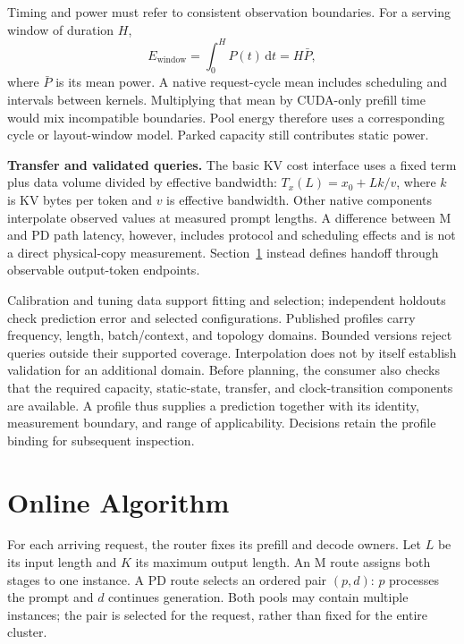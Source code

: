 \documentclass[11pt,a4paper,twocolumn]{article}
\newcommand{\para}[1]{\par\noindent\textbf{#1}\enspace}
\begin{document}
Timing and power must refer to consistent observation
boundaries. For a serving window of duration $H$,
\begin{equation}
E_{\mathrm{window}}=\int_0^H P(t)\,\mathrm{d}t=H\bar P,
\end{equation}
where $\bar P$ is its mean power. A native request-cycle mean
includes scheduling and intervals between kernels. Multiplying
that mean by CUDA-only prefill time would mix incompatible
boundaries. Pool energy therefore uses a corresponding cycle
or layout-window model. Parked capacity still contributes
static power.

\para{Transfer and validated queries.}
The basic KV cost interface uses a fixed term plus data volume
divided by effective bandwidth:
$T_x(L)=x_0+Lk/v$, where $k$ is KV bytes per token and $v$
is effective bandwidth. Other native components interpolate
observed values at measured prompt lengths. A difference
between M and PD path latency, however, includes protocol and
scheduling effects and is not a direct physical-copy
measurement. Section~\ref{sec:online} instead defines handoff
through observable output-token endpoints.

Calibration and tuning data support fitting and selection;
independent holdouts check prediction error and selected
configurations. Published profiles carry frequency, length,
batch/context, and topology domains. Bounded versions reject
queries outside their supported coverage. Interpolation does
not by itself establish validation for an additional domain.
Before planning, the consumer also checks that the required
capacity, static-state, transfer, and clock-transition
components are available. A profile thus supplies a prediction
together with its identity, measurement boundary, and range
of applicability. Decisions retain the profile binding for
subsequent inspection.

\section{Online Algorithm}
\label{sec:online}

For each arriving request, the router fixes its prefill and
decode owners. Let $L$ be its input length and $K$ its maximum
output length. An M route assigns both stages to one instance.
A PD route selects an ordered pair $(p,d)$: $p$ processes the
prompt and $d$ continues generation. Both pools may contain
multiple instances; the pair is selected for the request,
rather than fixed for the entire cluster.
\end{document}
